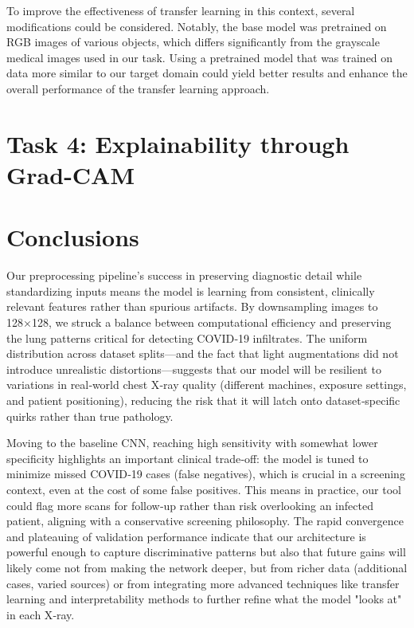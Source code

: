 \documentclass[conference]{IEEEtran}
\begin{document}
To improve the effectiveness of transfer learning in this context, several modifications could be considered. Notably, the base model was pretrained on RGB images of various objects, which differs significantly from the grayscale medical images used in our task. Using a pretrained model that was trained on data more similar to our target domain could yield better results and enhance the overall performance of the transfer learning approach.\\






\section{Task 4: Explainability through Grad-CAM} \label{sec:task_4}



\section{Conclusions}\label{sec:conclusions}

Our preprocessing pipeline’s success in preserving diagnostic detail while standardizing inputs means the model is learning from consistent, clinically relevant features rather than spurious artifacts. By downsampling images to 128×128, we struck a balance between computational efficiency and preserving the lung patterns critical for detecting COVID‑19 infiltrates. The uniform distribution across dataset splits—and the fact that light augmentations did not introduce unrealistic distortions—suggests that our model will be resilient to variations in real‑world chest X‑ray quality (different machines, exposure settings, and patient positioning), reducing the risk that it will latch onto dataset‐specific quirks rather than true pathology.

Moving to the baseline CNN, reaching high sensitivity with somewhat lower specificity highlights an important clinical trade‑off: the model is tuned to minimize missed COVID‑19 cases (false negatives), which is crucial in a screening context, even at the cost of some false positives. This means in practice, our tool could flag more scans for follow‑up rather than risk overlooking an infected patient, aligning with a conservative screening philosophy. The rapid convergence and plateauing of validation performance indicate that our architecture is powerful enough to capture discriminative patterns but also that future gains will likely come not from making the network deeper, but from richer data (additional cases, varied sources) or from integrating more advanced techniques like transfer learning and interpretability methods to further refine what the model "looks at" in each X‑ray.
\end{document}
